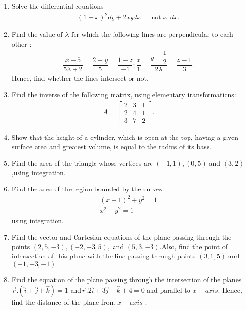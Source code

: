 \documentclass[12pt,-letter paper]{article}
\providecommand{\myvec}[1]{\ensuremath{\begin{bmatrix}#1\end{bmatrix}}}
\providecommand{\brak}[1]{\ensuremath{\left(#1\right)}}
\begin{document}
\begin{enumerate}
\item Solve the differential equations
\begin{align*}
    \brak{1+x}^2dy+2xy dx =\cot{x} \hspace{6pt} dx.
\end{align*} 

\item Find the value of $\lambda$ for which the following lines are perpendicular to each other :
\begin{align*}
    \dfrac{x-5}{5{\lambda+2}}=\dfrac{2-y}{5}=\dfrac{1-z}{-1};\dfrac{x}{1}=\dfrac{y+\dfrac{1}{2}}{2{\lambda}}=\dfrac{z-1}{3}.
\end{align*}
Hence, find whether the lines intersect or not.

\item Find the inverse of the following matrix, using elementary
transformations: 
\begin{align*}
    A=\myvec{2&3&1\\2&4&1\\3&7&2}.
\end{align*}

\item Show that the height of a cylinder, which is open at the top, having a given surface area and greatest volume, is equal to the radius of its base.

\item Find the area of the triangle whose vertices are $\brak{-1, 1},\brak {0, 5}$ and $\brak {3, 2}$,using integration.

\item Find the area of the region bounded by the curves  
\begin{align*}
\brak{x-1}^2 +y^2=1 \\  x^2+y^2=1
\end{align*}
using integration.

\item Find the vector and Cartesian equations of the plane passing through the points $\brak{2,5,-3},\brak{-2,-3,5},$ and $\brak{5,3,-3}$.Also, find the point of intersection of this plane with the line passing through points $\brak{3,1,5} $ and $\brak{-1,-3,-1}.$

\item Find the equation of the plane passing through the intersection of the planes $\overrightarrow r.\brak{\hat{i}+\hat{j}+\hat{k}}=1 $ and$\overrightarrow  r .2\hat{i}+3\hat{j}-\hat{k}+4=0 $ and parallel to $x-axis$. Hence, find the distance of the plane from $x-axis$ .


\end{enumerate}
\end{document}
